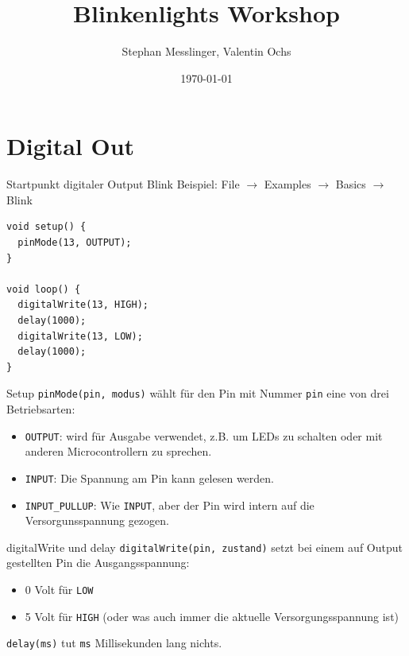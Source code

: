 \documentclass[bigger]{beamer}
\author{Stephan Messlinger, Valentin Ochs}
\date{\today}
\title{Blinkenlights Workshop}
\begin{document}
\maketitle

\section{Digital Out}
\label{sec:org419c71b}
\begin{frame}[fragile,label={sec:org14f1f20}]{Startpunkt digitaler Output}
 Blink Beispiel: File \(\rightarrow\) Examples \(\rightarrow\) Basics \(\rightarrow\) Blink

\begin{verbatim}
void setup() {
  pinMode(13, OUTPUT);
}

void loop() {
  digitalWrite(13, HIGH);
  delay(1000);
  digitalWrite(13, LOW);
  delay(1000);
}
\end{verbatim}
\end{frame}

\begin{frame}[fragile,label={sec:org26517c5}]{Setup}
 \texttt{pinMode(pin, modus)} wählt für den Pin mit Nummer \texttt{pin} eine von drei
Betriebsarten:

\begin{itemize}
\item \texttt{OUTPUT}: wird für Ausgabe verwendet, z.B. um LEDs zu schalten oder
mit anderen Microcontrollern zu sprechen.
\item \texttt{INPUT}: Die Spannung am Pin kann gelesen werden.
\item \texttt{INPUT\_PULLUP}: Wie \texttt{INPUT}, aber der Pin wird intern auf die
Versorgunsspannung gezogen.
\end{itemize}
\end{frame}

\begin{frame}[fragile,label={sec:org33632ec}]{digitalWrite und delay}
 \texttt{digitalWrite(pin, zustand)} setzt bei einem auf Output gestellten Pin
die Ausgangsspannung:

\begin{itemize}
\item 0 Volt für \texttt{LOW}
\item 5 Volt für \texttt{HIGH} (oder was auch immer die aktuelle
Versorgungsspannung ist)
\end{itemize}

\texttt{delay(ms)} tut \texttt{ms} Millisekunden lang nichts.
\end{frame}
\end{document}
